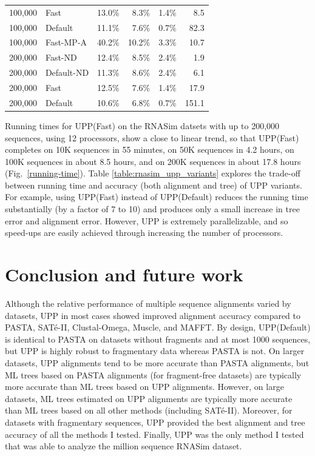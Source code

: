 \begin{table}[htpb]
{\begin{tabular}{|l|l|r|r|r|r|}
100,000&Fast&13.0\%&8.3\%&1.4\%&8.5\\
100,000&Default&11.1\%&7.6\%&0.7\%&82.3\\
100,000&Fast-MP-A&40.2\%&10.2\%&3.3\%&10.7\\
\hline
200,000&Fast-ND&12.4\%&8.5\%&2.4\%&1.9\\
200,000&Default-ND&11.3\%&8.6\%&2.4\%&6.1\\
200,000&Fast&12.5\%&7.6\%&1.4\%&17.9\\
200,000&Default&10.6\%&6.8\%&0.7\%&151.1\\
\hline
\end{tabular}}
\end{table}

Running times for UPP(Fast) on the RNASim datsets
with up to 200,000 sequences, using 12 processors,
show a close to linear trend, so that
UPP(Fast) completes on 10K sequences in 55 minutes, 
on 50K sequences in 4.2 hours,
on 100K sequences in about 8.5 hours,
and on 200K sequences in about 17.8 hours (Fig.~\ref{running-time}).
Table \ref{table:rnasim_upp_variants} explores
the trade-off between running time and 
accuracy (both alignment and tree)  of 
UPP variants.
For example,  using UPP(Fast) instead of UPP(Default)
reduces the running time substantially (by a factor
of 7 to 10) and produces only a small
increase in tree error and 
alignment error.
However, UPP is extremely parallelizable, and so
speed-ups are easily achieved through increasing
the number of processors.

\section{Conclusion and future work}\label{upp:conclusion}
Although the relative  performance
of multiple sequence alignments 
varied by datasets,   UPP in most cases showed improved alignment accuracy compared
to PASTA, SAT\'e-II, Clustal-Omega, Muscle, 
and MAFFT. 
By design, 
UPP(Default) is identical to PASTA on datasets without fragments and at most 
1000 sequences, but UPP is highly robust to fragmentary data whereas PASTA is not. 
On larger datasets,
UPP alignments tend to be more accurate than PASTA alignments, 
but ML trees based on PASTA alignments (for fragment-free datasets) are typically
more accurate than ML trees based on UPP alignments. 
However, on large datasets, 
ML trees estimated on UPP alignments are typically more accurate than 
ML trees based on all other methods (including SAT\'e-II). 
Moreover, for datasets with fragmentary sequences,
UPP provided the best alignment and tree accuracy of all the methods I tested.
Finally, UPP was the only method I tested that was able to analyze the million sequence RNASim dataset. 

